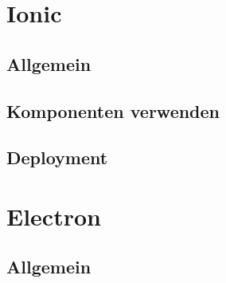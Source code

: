 \section{Ionic}
\subsection{Allgemein}
\subsection{Komponenten verwenden}
\subsection{Deployment}

\section{Electron}
\subsection{Allgemein}
